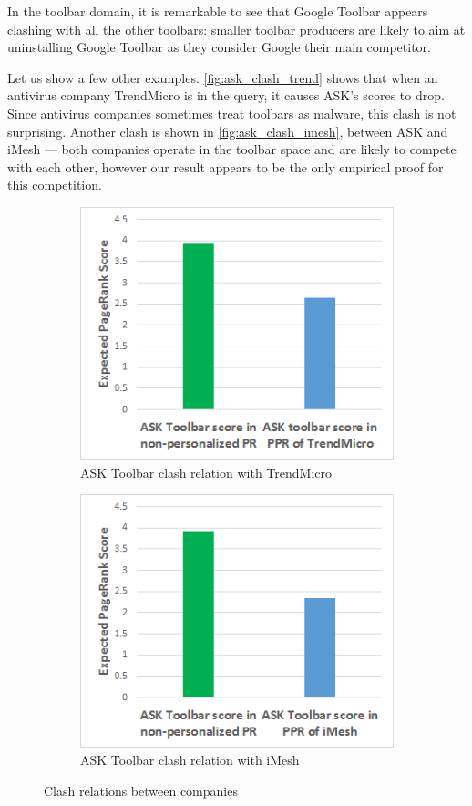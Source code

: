 \documentclass[11pt,oneside]{book}
\begin{document}
In the toolbar domain, it is remarkable to see that Google Toolbar appears clashing with all the other toolbars: smaller toolbar producers are likely to aim at uninstalling Google Toolbar as they consider Google their main competitor.

Let us show a few other examples. \autoref{fig:ask_clash_trend} shows that when an antivirus company TrendMicro is in the query, it causes ASK's scores to drop. Since antivirus companies sometimes treat toolbars as malware, this clash is not surprising. Another clash is shown in \autoref{fig:ask_clash_imesh}, between ASK and iMesh --- both companies operate in the toolbar space and are likely to compete with each other, however our result appears to be the only empirical proof for this competition.


\begin{figure}[!htbp]
\centering
\begin{subfigure}[b]{0.8\textwidth}
	\centering
\includegraphics[scale=0.8]{figures/ask_clash_trend.png}
\caption{ASK Toolbar clash relation with TrendMicro}
\label{fig:ask_clash_trend}
\end{subfigure}
\begin{subfigure}[b]{0.8\textwidth}
	\centering
\includegraphics[scale=0.8]{figures/ask_clash_imesh.png}
\caption{ASK Toolbar clash relation with iMesh}
\label{fig:ask_clash_imesh}
\end{subfigure}
\caption{Clash relations between companies}
	\label{fig:clash_1}
\end{figure}
\end{document}
